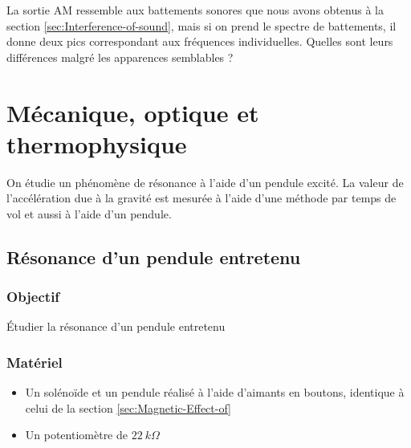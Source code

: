 \documentclass{book}
\begin{document}
La sortie AM ressemble aux battements sonores que nous avons obtenus à la section  \ref{sec:Interference-of-sound}, mais si on prend le spectre de battements, il donne deux pics correspondant aux fréquences individuelles. Quelles sont leurs différences malgré les apparences semblables ?







\chapter{Mécanique, optique et thermophysique}


On étudie un phénomène de résonance à l'aide d'un pendule excité. La valeur de l'accélération due à la gravité est mesurée à l'aide d'une méthode par temps de vol et aussi à l'aide d'un pendule.







\section{Résonance d'un pendule entretenu}



\subsection{Objectif}


Étudier la résonance d'un pendule entretenu




\subsection{Matériel}


\begin{itemize}
  \item Un solénoïde et un pendule réalisé à l'aide d'aimants en boutons, identique à celui de la section  \ref{sec:Magnetic-Effect-of}
  \item Un potentiomètre de $22\ k\Omega$
\end{itemize}
\end{document}
